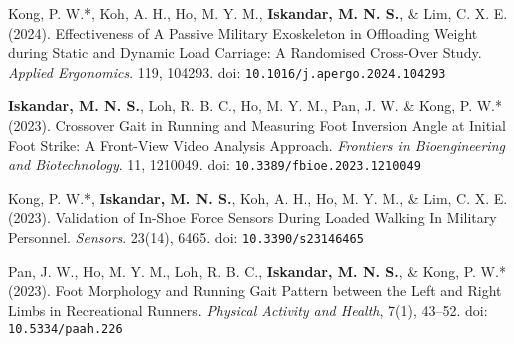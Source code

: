 \documentclass[../main.tex]{subfiles}
\begin{document}
        \begin{etaremune}
            \item\label{article: spm exoskeleton}{Kong, P. W.*, Koh, A. H., Ho, M. Y. M., \textbf{Iskandar, M. N. S.}, \& Lim, C. X. E. (2024). Effectiveness of A Passive Military Exoskeleton in Offloading Weight during Static and Dynamic Load Carriage: A Randomised Cross-Over Study. \textit{Applied Ergonomics}. 119, 104293. doi: \nolinkurl{10.1016/j.apergo.2024.104293} \href{https://doi.org/10.1016/j.apergo.2024.104293}{\faFilePdfO} \href{https://github.com/Shahril-Iskandar/publication-exoskeleton}{\faGithub}}

            \item\label{article: frontiers crossover gait} {\textbf{Iskandar, M. N. S.}, Loh, R. B. C., Ho, M. Y. M., Pan, J. W. \& Kong, P. W.* (2023). Crossover Gait in Running and Measuring Foot Inversion Angle at Initial Foot Strike: A Front-View Video Analysis Approach. \textit{Frontiers in Bioengineering and Biotechnology}. 11, 1210049. doi: \nolinkurl{10.3389/fbioe.2023.1210049} \href{https://doi.org/10.3389/fbioe.2023.1210049}{\faFilePdfO} \href{https://github.com/Shahril-Iskandar/publication-crossover-gait}{\faGithub}} %
            
            \item\label{article: sensors validation exoskeletal} {Kong, P. W.*, \textbf{Iskandar, M. N. S.}, Koh, A. H., Ho, M. Y. M., \& Lim, C. X. E. (2023). Validation of In-Shoe Force Sensors During Loaded Walking In Military Personnel. \textit{Sensors}. 23(14), 6465. doi: \nolinkurl{10.3390/s23146465} \href{https://doi.org/10.3390/s23146465}{\faFilePdfO} \href{https://github.com/Shahril-Iskandar/publication-loadsol-validation-military}{\faGithub}} %
            
            \item\label{article: paah foot morphology} {Pan, J. W., Ho, M. Y. M., Loh, R. B. C., \textbf{Iskandar, M. N. S.}, \& Kong, P. W.* (2023). Foot Morphology and Running Gait Pattern between the Left and Right Limbs in Recreational Runners. \textit{Physical Activity and Health}, 7(1), 43–52. doi: \nolinkurl{10.5334/paah.226} \href{https://doi.org/10.5334/paah.226}{\faFilePdfO}} %
        \end{etaremune}
                
\end{document}
